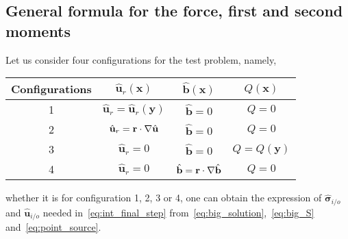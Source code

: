 \subsection{General formula for the force, first and second moments}
Let us consider four configurations for the test problem, namely,
\begin{center}
    \begin{tabular}{|cccc|}\hline
        Configurations & $\hat{\textbf{u}}_r(\textbf{x})$&$\hat{\textbf{b}}(\textbf{x})$ & $Q(\textbf{x})$\\ \hline
        1 & $\hat{\textbf{u}}_r = \hat{\textbf{u}}_r(\textbf{y})$& $\hat{\textbf{b}} = 0$ & $Q= 0$\\
        2 & $\hat{\textbf{u}}_r = \textbf{r}\cdot \mathbf{\nabla} \hat{\textbf{u}}$& $\hat{\textbf{b}} = 0$ & $Q= 0$\\
        3 & $\hat{\textbf{u}}_r = 0$& $\hat{\textbf{b}} = 0$ & $Q=Q(\textbf{y}) $\\
        4 & $\hat{\textbf{u}}_r = 0$& $\hat{\textbf{b}} = \textbf{r}\cdot \mathbf{\nabla}\hat{\textbf{b}}$ & $Q= 0$\\ \hline
    \end{tabular}
\end{center}
whether it is for configuration 1, 2, 3 or 4, one can obtain the expression of $\hat{\bm\sigma}_{i/o}$ and $\hat{\textbf{u}}_{i/o}$ needed in~\ref{eq:int_final_step} from~\ref{eq:big_solution},~\ref{eq:big_S} and~\ref{eq:point_source}. 

